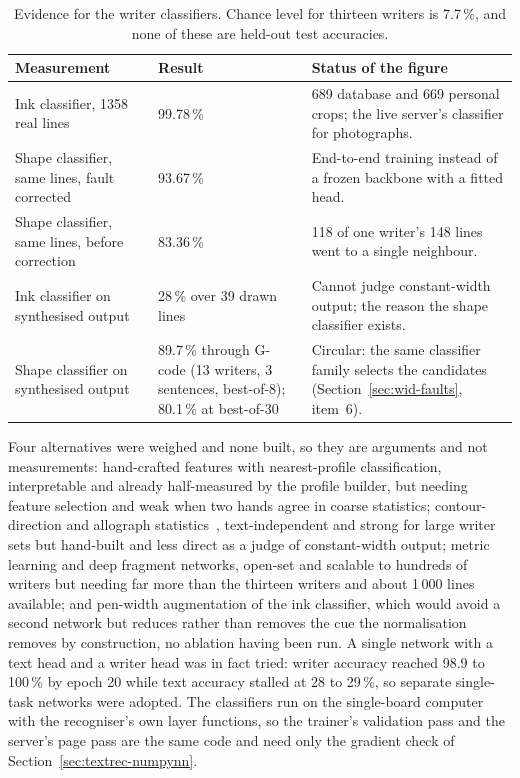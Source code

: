 \begin{table}[!htbp]
\centering
\fontsize{8}{9.6}\selectfont
\setlength{\tabcolsep}{3.5pt}
\begin{tabularx}{\linewidth}{|p{3.1cm}|p{1.9cm}|X|}
\hline
\textbf{Measurement} & \textbf{Result} & \textbf{Status of the figure} \\
\hline
Ink classifier, 1358 real lines & 99.78\,\% & 689 database and 669 personal crops; the live server's classifier for photographs. \\
\hline
Shape classifier, same lines, fault corrected & 93.67\,\% & End-to-end training instead of a frozen backbone with a fitted head. \\
\hline
Shape classifier, same lines, before correction & 83.36\,\% & 118 of one writer's 148 lines went to a single neighbour. \\
\hline
Ink classifier on synthesised output & 28\,\% over 39 drawn lines & Cannot judge constant-width output; the reason the shape classifier exists. \\
\hline
Shape classifier on synthesised output & 89.7\,\% through G-code (13 writers, 3 sentences, best-of-8); 80.1\,\% at best-of-30 & Circular: the same classifier family selects the candidates (Section~\ref{sec:wid-faults}, item~6). \\
\hline
\end{tabularx}
\caption{Evidence for the writer classifiers. Chance level for thirteen writers is 7.7\,\%, and none of these are held-out test accuracies.}
\label{tab:wid-results}
\end{table}

Four alternatives were weighed and none built, so they are arguments and not measurements: hand-crafted features with nearest-profile classification, interpretable and already half-measured by the profile builder, but needing feature selection and weak when two hands agree in coarse statistics; contour-direction and allograph statistics~\cite{bulacu2007}, text-independent and strong for large writer sets but hand-built and less direct as a judge of constant-width output; metric learning and deep fragment networks, open-set and scalable to hundreds of writers but needing far more than the thirteen writers and about 1\,000 lines available; and pen-width augmentation of the ink classifier, which would avoid a second network but reduces rather than removes the cue the normalisation removes by construction, no ablation having been run.
A single network with a text head and a writer head was in fact tried: writer accuracy reached 98.9 to 100\,\% by epoch 20 while text accuracy stalled at 28 to 29\,\%, so separate single-task networks were adopted.
The classifiers run on the single-board computer with the recogniser's own layer functions, so the trainer's validation pass and the server's page pass are the same code and need only the gradient check of Section~\ref{sec:textrec-numpynn}.

